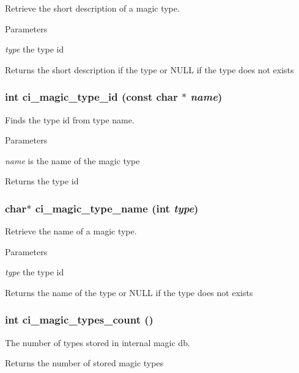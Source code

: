 Retrieve the short description of a magic type. 
\begin{DoxyParams}{Parameters}
\item[{\em type}]the type id \end{DoxyParams}
\begin{DoxyReturn}{Returns}
the short description if the type or NULL if the type does not exists 
\end{DoxyReturn}
\hypertarget{group__DATATYPE_ga46e48196d9902618161bdc1e160e8c00}{
\subsubsection[{ci\_\-magic\_\-type\_\-id}]{\setlength{\rightskip}{0pt plus 5cm}int ci\_\-magic\_\-type\_\-id (const char $\ast$ {\em name})}}
\label{group__DATATYPE_ga46e48196d9902618161bdc1e160e8c00}


Finds the type id from type name. 
\begin{DoxyParams}{Parameters}
\item[{\em name}]is the name of the magic type \end{DoxyParams}
\begin{DoxyReturn}{Returns}
the type id 
\end{DoxyReturn}
\hypertarget{group__DATATYPE_ga2d765f13e58b595e7a95ec025118af8b}{
\subsubsection[{ci\_\-magic\_\-type\_\-name}]{\setlength{\rightskip}{0pt plus 5cm}char$\ast$ ci\_\-magic\_\-type\_\-name (int {\em type})}}
\label{group__DATATYPE_ga2d765f13e58b595e7a95ec025118af8b}


Retrieve the name of a magic type. 
\begin{DoxyParams}{Parameters}
\item[{\em type}]the type id \end{DoxyParams}
\begin{DoxyReturn}{Returns}
the name of the type or NULL if the type does not exists 
\end{DoxyReturn}
\hypertarget{group__DATATYPE_ga4b6d1fb7ebd31e751d2bae64e7ee042b}{
\subsubsection[{ci\_\-magic\_\-types\_\-count}]{\setlength{\rightskip}{0pt plus 5cm}int ci\_\-magic\_\-types\_\-count ()}}
\label{group__DATATYPE_ga4b6d1fb7ebd31e751d2bae64e7ee042b}


The number of types stored in internal magic db. \begin{DoxyReturn}{Returns}
the number of stored magic types 
\end{DoxyReturn}
